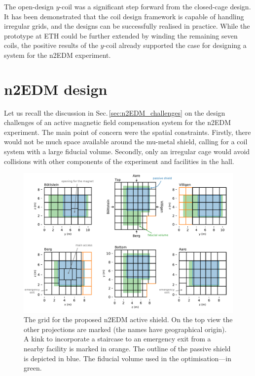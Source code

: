 

The open-design $y$-coil was a significant step forward from the closed-cage design.
It has been demonstrated that the coil design framework is capable of handling irregular grids, and the designs can be successfully realised in practice.
While the prototype at ETH could be further extended by winding the remaining seven coils, the positive results of the $y$-coil already supported the case for designing a system for the n2EDM experiment.




\section{n2EDM design}
Let us recall the discussion in Sec.\,\ref{sec:n2EDM_challenges} on the design challenges of an active magnetic field compensation system for the n2EDM experiment.
The main point of concern were the spatial constraints.
Firstly, there would not be much space available around the mu-metal shield, calling for a coil system with a large fiducial volume.
Secondly, only an irregular cage would avoid collisions with other components of the experiment and facilities in the hall.

\begin{figure}
  \centering
  \includegraphics[width=\linewidth]{gfx/prototype/n2EDM_active_shield_all_faces.pdf}
  \caption{The grid for the proposed n2EDM active shield. On the top view the other projections are marked (the names have geographical origin). A kink to incorporate a staircase to an emergency exit from a nearby facility is marked in orange. The outline of the passive shield is depicted in blue. The fiducial volume used in the optimisation---in green.}\label{fig:n2EDM_design_top}
\end{figure}

